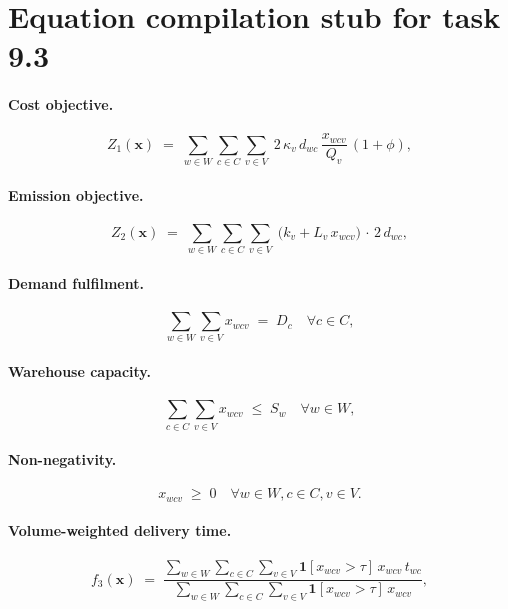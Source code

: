 \documentclass{article}
\begin{document}
\section*{Equation compilation stub for task 9.3}

\paragraph{Cost objective.}
\begin{equation}
Z_1(\mathbf{x}) \;=\; \sum_{w \in W} \sum_{c \in C}
\sum_{v \in V} \;
2 \, \kappa_v \, d_{wc} \, \frac{x_{wcv}}{Q_v} \,
(1 + \phi),
\label{eq:cost-objective}
\end{equation}

\paragraph{Emission objective.}
\begin{equation}
Z_2(\mathbf{x}) \;=\; \sum_{w \in W} \sum_{c \in C}
\sum_{v \in V} \;
\bigl( k_v + L_v \, x_{wcv} \bigr) \,
\cdot \, 2 \, d_{wc},
\label{eq:emission-objective}
\end{equation}

\paragraph{Demand fulfilment.}
\begin{equation}
\sum_{w \in W} \sum_{v \in V} x_{wcv} \;=\; D_c
\quad \forall c \in C,
\label{eq:demand-constraint}
\end{equation}

\paragraph{Warehouse capacity.}
\begin{equation}
\sum_{c \in C} \sum_{v \in V} x_{wcv} \;\leq\; S_w
\quad \forall w \in W,
\label{eq:capacity-constraint}
\end{equation}

\paragraph{Non-negativity.}
\begin{equation}
x_{wcv} \;\geq\; 0
\quad \forall w \in W, c \in C, v \in V.
\label{eq:nonnegativity}
\end{equation}

\paragraph{Volume-weighted delivery time.}
\begin{equation}
f_3(\mathbf{x}) \;=\;
\frac{
\displaystyle
\sum_{w \in W} \sum_{c \in C} \sum_{v \in V}
\mathbf{1}[x_{wcv} > \tau] \, x_{wcv} \, t_{wc}
}{
\displaystyle
\sum_{w \in W} \sum_{c \in C} \sum_{v \in V}
\mathbf{1}[x_{wcv} > \tau] \, x_{wcv}
},
\label{eq:f3-volume-weighted}
\end{equation}
\end{document}
